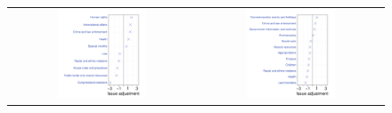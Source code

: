 \begin{figure}
  \center
  \begin{tabular}{cc}
    \includegraphics[width=0.5\textwidth]{chapter_inferring_issue_preferences/figures/3393_house_Ronald_Paul_400311.pdf} &
    \includegraphics[width=0.5\textwidth]{chapter_inferring_issue_preferences/figures/3393_house_Donald_Young_400440.pdf} \\

\end{tabular}
\end{figure}
